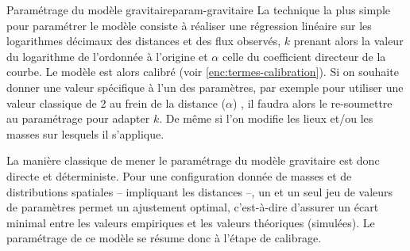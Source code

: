 \begin{encadre}{Paramétrage du modèle gravitaire}{param-gravitaire}
La technique la plus simple pour paramétrer le modèle consiste à réaliser une régression linéaire sur les logarithmes décimaux des distances et des flux observés, $k$ prenant alors la valeur du logarithme de l'ordonnée à l'origine et $\alpha$ celle du coefficient directeur de la courbe.	
Le modèle est alors calibré (voir \cref{enc:termes-calibration}).
Si on souhaite donner une valeur spécifique à l'un des paramètres, par exemple pour utiliser une valeur classique de 2 au frein de la distance ($\alpha$) \autocite{pumain_modegravitaire_2004}, il faudra alors le re-soumettre au paramétrage pour adapter $k$.
De même si l'on modifie les lieux et/ou les masses sur lesquels il s'applique.
\end{encadre}

La manière classique de mener le paramétrage du modèle gravitaire est donc directe et déterministe.
Pour une configuration donnée de masses et de distributions spatiales -- impliquant les distances --, un et un seul jeu de valeurs de paramètres permet un ajustement optimal, c'est-à-dire d'assurer un écart minimal entre les valeurs empiriques et les valeurs théoriques (simulées).
Le paramétrage de ce modèle se résume donc à l'étape de calibrage.


